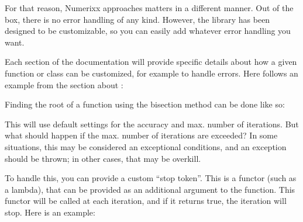 \documentclass[letterpaper,10pt,english]{sphinxmanual}
\begin{document}
\sphinxAtStartPar
For that reason, Numerixx approaches matters in a different manner. Out of the box, there is no error handling of any kind. However, the library has been designed to be customizable, so you can easily add whatever error handling you want.

\sphinxAtStartPar
Each section of the documentation will provide specific details about how a given function or class can be customized, for example to handle errors. Here follows an example from the section about {\hyperref[\detokenize{docRoots::doc}]{}}:

\sphinxAtStartPar
Finding the root of a function using the bisection method can be done like so:

\begin{sphinxVerbatim}[commandchars=\\\{\}]
\end{sphinxVerbatim}

\sphinxAtStartPar
This will use default settings for the accuracy and max. number of iterations. But what should happen if the max. number of iterations are exceeded? In some situations, this may be considered an exceptional conditions, and an exception should be thrown; in other cases, that may be overkill.

\sphinxAtStartPar
To handle this, you can provide a custom “stop token”. This is a functor (such as a lambda), that can be provided as an additional argument to the  function. This functor will be called at each iteration, and if it returns true, the iteration will stop. Here is an example:

\begin{sphinxVerbatim}[commandchars=\\\{\}]
\PYG{p}{[}\PYG{p}{]}
\end{sphinxVerbatim}
\end{document}
